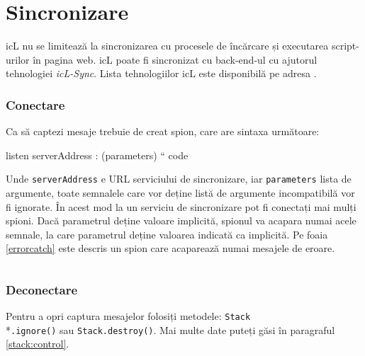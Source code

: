 \section{Sincronizare}
\label{sync}

icL nu se limitează la sincronizarea cu procesele de încărcare și executarea script-urilor în pagina web. icL poate fi sincronizat cu back-end-ul cu ajutorul tehnologiei \textit{icL-Sync}. Lista tehnologiilor icL este disponibilă pe adresa .

\subsubsection{Conectare}

Ca să captezi mesaje trebuie de creat spion, care are sintaxa următoare:
\begin{iclcode}
listen serverAddress : (parameters) {
	`` code
}
\end{iclcode}

Unde \texttt{serverAddress} e URL serviciului de sincronizare, iar \texttt{parameters} lista de argumente, toate semnalele care vor deține listă de argumente incompatibilă vor fi ignorate. În acest mod la un serviciu de sincronizare pot fi conectați mai mulți spioni. Dacă parametrul deține valoare implicită, spionul va acapara numai acele semnale, la care parametrul deține valoarea indicată ca implicită. Pe foaia \ref{errorcatch} este descris un spion care acaparează numai mesajele de eroare.


\begin{sourcecode}
\label{errorcatch}
\inputminted[linenos]{icl}{../sources/errorcatch.icL}
\end{sourcecode}

\subsubsection{Deconectare}

Pentru a opri captura mesajelor folosiți metodele: \texttt{Stack}\\*\texttt{.ignore()} sau \texttt{Stack.destroy()}. Mai multe date puteți găsi în paragraful \ref{stack:control}.
